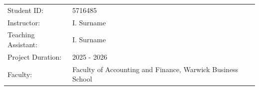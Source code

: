 \begin{titlepage}
\begin{center}
\bigskip
\bigskip

\begin{tabular}{ll}
    Student ID: & 5716485 \\
    Instructor: & I. Surname \\
    Teaching Assistant: & I. Surname \\
    Project Duration: & 2025 - 2026 \\
    Faculty: & Faculty of Accounting and Finance, Warwick Business School
\end{tabular}

\bigskip
\bigskip
\vfill

\end{center}


\end{titlepage}
